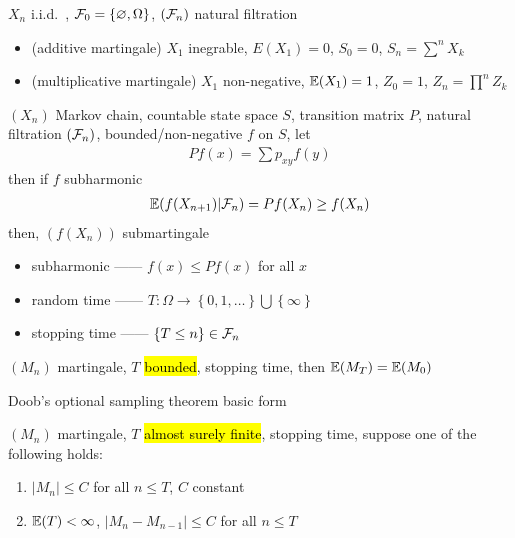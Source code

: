 \begin{example}
    $X_n$ i.i.d.\ , $\mathcal{F}_0 = \left\{ \varnothing, \Omega \right\}$, $(\mathcal{F}_n)$ natural filtration
    \begin{itemize}
        \item (additive martingale) $X_1$ inegrable, $E(X_1) = 0$, $S_0 = 0$, $S_n = \sum^n X_k$
        \item (multiplicative martingale) $X_1$ non-negative, $\mathbb{E}(X_1) = 1$, $Z_0 = 1$, $Z_n = \prod^n Z_k$
    \end{itemize}
\end{example}

\begin{example}
    $(X_n)$ Markov chain, countable state space $S$, transition matrix $P$, natural filtration $(\mathcal{F}_n)$, bounded/non-negative $f$ on $S$, let
    \begin{align*}
        Pf(x) = \sum p_{xy} f(y)
    \end{align*}
    then if $f$ subharmonic
    \begin{align*}
        \mathbb{E}(f(X_{n+1})|\mathcal{F}_n) = Pf(X_n) \geq f(X_n)
    \end{align*}
    then, $(f(X_n))$ submartingale
\end{example}

\begin{itemize}
    \item subharmonic ------ $f(x) \leq Pf(x)$ for all $x$
    \item random time ------ $T:\Omega \rightarrow \left\{ 0, 1, \dots \right\} \bigcup \left\{ \infty \right\}$
    \item stopping time ------ $\left\{ T \leq n \right\} \in \mathcal{F}_n$
\end{itemize}

\begin{thm}
    $(M_n)$ martingale, $T$ \hl{bounded}, stopping time, then $\mathbb{E}(M_T) = \mathbb{E}(M_0)$
\end{thm}

\begin{fact}
    Doob's optional sampling theorem basic form
\end{fact}

\begin{thm}
    $(M_n)$ martingale, $T$ \hl{almost surely finite}, stopping time, suppose one of the following holds:
    \begin{enumerate}
        \item $|M_n| \leq C$ for all $n \leq T$, $C$ constant
        \item $\mathbb{E}(T) < \infty$, $|M_n - M_{n-1}| \leq C$ for all $n \leq T$
    \end{enumerate}
\end{thm}

